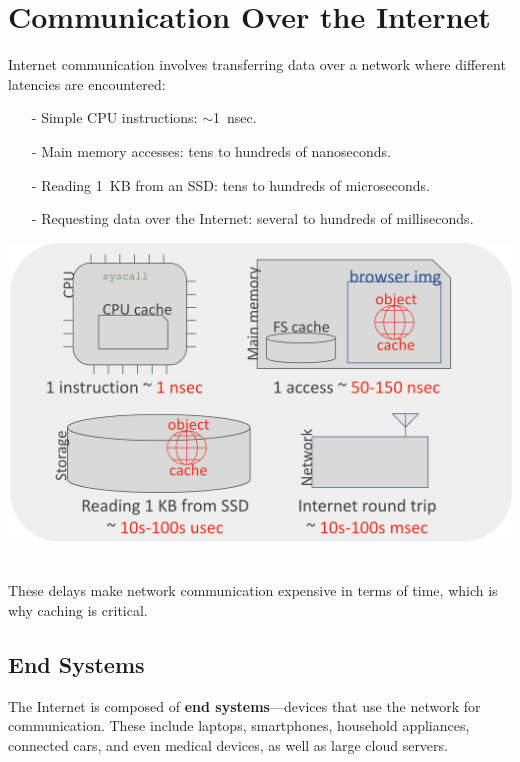 \section{Communication Over the Internet}
Internet communication involves transferring data over a network where different latencies are encountered: \\
\begin{minipage}{0.45\textwidth}
  \begin{itemize}
    \item[-] Simple CPU instructions: \(\sim\)1~nsec.
    \item[-] Main memory accesses: tens to hundreds of nanoseconds.
    \item[-] Reading 1~KB from an SSD: tens to hundreds of microseconds.
    \item[-] Requesting data over the Internet: several to hundreds of milliseconds.
\end{itemize}
\end{minipage}
\hfill
\vline
\hfill
\begin{minipage}{0.45\textwidth}
\begin{center}
  \includegraphics[width=1.15\textwidth]{chapters/L1/images/internet.png}
\end{center}
\end{minipage}\\[5px]
These delays make network communication expensive in terms of time, which is why caching is critical.
\vfill
\subsection{End Systems}

The Internet is composed of \textbf{end systems}—devices that use the network for communication. These include laptops, smartphones, household appliances, connected cars, and even medical devices, as well as large cloud servers.

